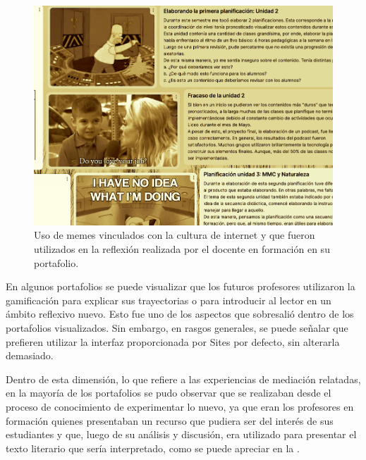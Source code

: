 \begin{figure}[htpb]
\centering
\begin{minipage}{.7\textwidth}
\caption{Uso de memes vinculados con la cultura de internet y que fueron utilizados en la reflexión realizada por el docente en formación en su portafolio.}
\label{fig-02}
\includegraphics[width=\textwidth]{fig2.png}
\end{minipage}
\end{figure}

En algunos portafolios se puede visualizar que los futuros profesores
utilizaron la gamificación para explicar sus trayectorias o para
introducir al lector en un ámbito reflexivo nuevo. Esto fue uno de los
aspectos que sobresalió dentro de los portafolios visualizados. Sin
embargo, en rasgos generales, se puede señalar que prefieren utilizar la
interfaz proporcionada por Sites por defecto, sin alterarla demasiado.

Dentro de esta dimensión, lo que refiere a las experiencias de mediación
relatadas, en la mayoría de los portafolios se pudo observar que se
realizaban desde el proceso de conocimiento de experimentar lo nuevo, ya
que eran los profesores en formación quienes presentaban un recurso que
pudiera ser del interés de sus estudiantes y que, luego de su análisis y
discusión, era utilizado para presentar el texto literario que sería
interpretado, como se puede apreciar en la .


